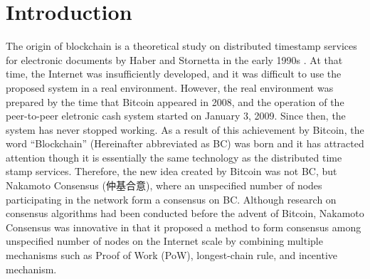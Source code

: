 \documentclass[graybox]{svmult}
\begin{document}
\section{Introduction}
\label{sec:intro}
The origin of blockchain is a theoretical study on distributed timestamp services for electronic documents by Haber and Stornetta in the early 1990s
\cite{HS1991,BHS1993,HS1997}.
At that time, the Internet was insufficiently developed, and it was difficult to use the proposed system in a real environment.
However, the real environment was prepared by the time that Bitcoin \cite{nakamoto} appeared in 2008, and the operation of the peer-to-peer eletronic cash system started on January 3, 2009.
Since then, the system has never stopped working. 
As a result of this achievement by Bitcoin, the word ``Blockchain'' (Hereinafter abbreviated as BC) was born and it has attracted attention though it is essentially the same technology as the distributed time stamp services.
Therefore, the new idea created by Bitcoin was not BC, but Nakamoto Consensus (仲基合意), where an unspecified number of nodes participating in the network form a consensus on BC. 
Although research on consensus algorithms had been conducted before the advent of Bitcoin, Nakamoto Consensus was innovative in that it proposed a method to form consensus among unspecified number of nodes on the Internet scale by combining multiple mechanisms such as Proof of Work (PoW)\cite{DN1993,JJ1999}, longest-chain rule, and incentive mechanism.
\end{document}
